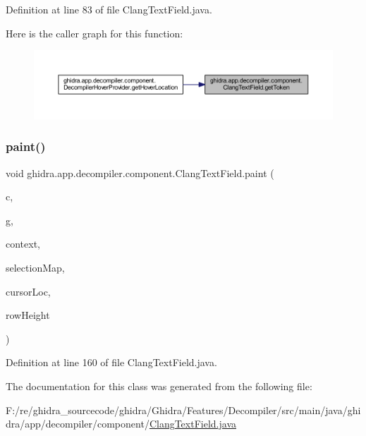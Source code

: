 Definition at line 83 of file Clang\+Text\+Field.\+java.

Here is the caller graph for this function\+:
\nopagebreak
\begin{figure}[H]
\begin{center}
\leavevmode
\includegraphics[width=350pt]{classghidra_1_1app_1_1decompiler_1_1component_1_1_clang_text_field_a7c4539de6243e532d433b2a2deb13645_icgraph}
\end{center}
\end{figure}
\mbox{\label{classghidra_1_1app_1_1decompiler_1_1component_1_1_clang_text_field_a78be5e487303649a4dde756c3e06c95c}} 
\subsubsection{\texorpdfstring{paint()}{paint()}}
{\footnotesize\ttfamily void ghidra.\+app.\+decompiler.\+component.\+Clang\+Text\+Field.\+paint (\begin{DoxyParamCaption}\item[{J\+Component}]{c,  }\item[{Graphics}]{g,  }\item[{Paint\+Context}]{context,  }\item[{Field\+Background\+Color\+Manager}]{selection\+Map,  }\item[{Row\+Col\+Location}]{cursor\+Loc,  }\item[{int}]{row\+Height }\end{DoxyParamCaption})\hspace{0.3cm}{\ttfamily [inline]}}



Definition at line 160 of file Clang\+Text\+Field.\+java.



The documentation for this class was generated from the following file\+:\begin{DoxyCompactItemize}
\item 
F\+:/re/ghidra\+\_\+sourcecode/ghidra/\+Ghidra/\+Features/\+Decompiler/src/main/java/ghidra/app/decompiler/component/\mbox{\hyperlink{_clang_text_field_8java}{Clang\+Text\+Field.\+java}}\end{DoxyCompactItemize}
